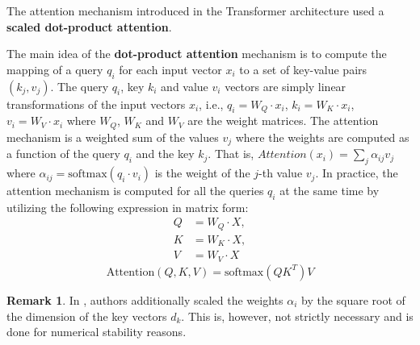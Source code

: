 \documentclass[a4paper, twoside]{report}
\theoremstyle{definition}
\newtheorem{remark}[theorem]{Remark}
\numberwithin{equation}{section}
\begin{document}

The attention mechanism introduced in the Transformer architecture \cite{1706.03762} used a \textbf{scaled dot-product attention}.


The main idea of the \textbf{dot-product attention} mechanism is to compute the mapping of a query $q_i$ for each input vector $x_i$ to a set of key-value pairs $(k_j, v_j)$.
The query $q_i$, key $k_i$ and value $v_i$ vectors are simply linear transformations of the input vectors $x_i$,
i.e., $q_i=W_Q\cdot x_i$, $k_i=W_K\cdot x_i$, $v_i=W_V\cdot x_i$ where $W_Q$, $W_K$ and $W_V$ are the weight matrices.
The attention mechanism is a weighted sum of the values $v_j$ where the weights are computed as a function of the query $q_i$ and the key $k_j$.
That is, $Attention(x_i)=\sum_j \alpha_{ij} v_j$ where $\alpha_{ij}=\text{softmax}(q_i \cdot v_i)$ is the weight of the $j$-th value $v_j$.
In practice, the attention mechanism is computed for all the queries $q_i$ at the same time by utilizing the following expression in matrix form:
\begin{equation}
    \begin{array}{rll}
        Q & = W_Q \cdot X, \\
        K & = W_K \cdot X, \\
        V & = W_V \cdot X
    \end{array}
\end{equation}
\begin{equation}\label{eq:dot_product_attention_matrix}
    \text{Attention}(Q, K, V)=\text{softmax}(Q K^T) V
\end{equation}

\begin{remark}
    In \cite{1706.03762}, authors additionally scaled the weights $\alpha_i$ by the square root of the dimension of the key vectors $d_k$.
    This is, however, not strictly necessary and is done for numerical stability reasons.
\end{remark}
\end{document}
